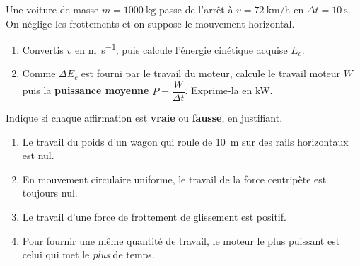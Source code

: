 \documentclass[11pt,a4paper]{article}
\begin{document}
\begin{exo}
Une voiture de masse $m=\qty{1000}{\kilogram}$ passe de l'arrêt à $v=\qty{72}{\kilo\metre\per\hour}$ en
$\Delta t=\qty{10}{\second}$. On néglige les frottements et on suppose le mouvement horizontal.
\begin{enumerate}[label=\alph*)]
  \item Convertis $v$ en \si{\metre\per\second}, puis calcule l'énergie cinétique acquise $E_c$.
  \item Comme $\Delta E_c$ est fourni par le travail du moteur, calcule le travail moteur $W$ puis la
        \textbf{puissance moyenne} $P=\dfrac{W}{\Delta t}$. Exprime-la en \si{\kilo\watt}.
\end{enumerate}
\end{exo}

\begin{exo}
Indique si chaque affirmation est \textbf{vraie} ou \textbf{fausse}, en justifiant.
\begin{enumerate}[label=\alph*)]
  \item Le travail du poids d'un wagon qui roule de \qty{10}{\metre} sur des rails horizontaux est nul.
  \item En mouvement circulaire uniforme, le travail de la force centripète est toujours nul.
  \item Le travail d'une force de frottement de glissement est positif.
  \item Pour fournir une même quantité de travail, le moteur le plus puissant est celui qui met le
        \emph{plus} de temps.
\end{enumerate}
\end{exo}
\end{document}
